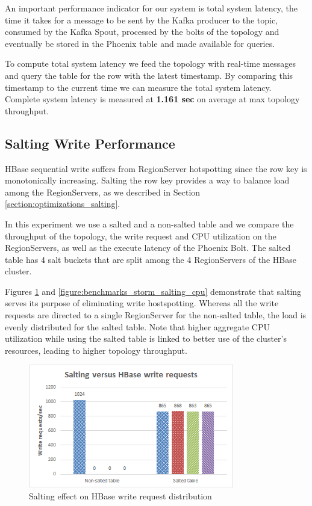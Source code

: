 An important performance indicator for our system is total system latency, the time it takes for a message to be sent by the Kafka producer to the topic, consumed by the Kafka Spout, processed by the bolts of the topology and eventually be stored in the Phoenix table and made available for queries.

To compute total system latency we feed the topology with real-time messages and query the table for the row with the latest timestamp. By comparing this timestamp to the current time we can measure the total system latency. Complete system latency is measured at \textbf{1.161 sec} on average at max topology throughput.

\subsection{Salting Write Performance}\label{subsection:benchmarks_storm_salting}

HBase sequential write suffers from RegionServer hotspotting since the row key is monotonically increasing. Salting the row key provides a way to balance load among the RegionServers, as we described in Section \ref{section:optimizations_salting}.

In this experiment we use a salted and a non-salted table and we compare the throughput of the topology, the write request and CPU utilization on the RegionServers, as well as the execute latency of the Phoenix Bolt. The salted table has 4 salt buckets that are split among the 4 RegionServers of the HBase cluster.

Figures \ref{figure:benchmarks_storm_salting_requests} and \ref{figure:benchmarks_storm_salting_cpu} demonstrate that salting serves its purpose of eliminating write hostspotting. Whereas all the write requests are directed to a single RegionServer for the non-salted table, the load is evenly distributed for the salted table. Note that higher aggregate CPU utilization while using the salted table is linked to better use of the cluster's resources, leading to higher topology throughput.

\begin{figure}[H]
\centering
\includegraphics[width=0.8\textwidth]{figures/benchmarks_storm_salting_requests}
\caption{Salting effect on HBase write request distribution}
\label{figure:benchmarks_storm_salting_requests}
\end{figure}

